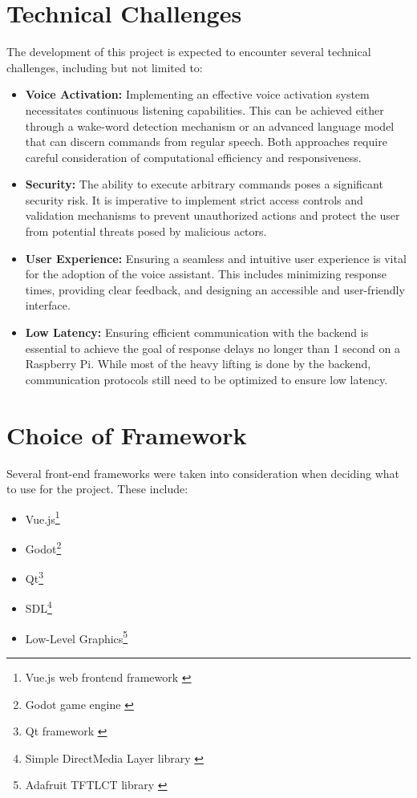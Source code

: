 \section{Technical Challenges}
The development of this project is expected to encounter several technical challenges, including but not limited to:
\begin{itemize}
    \item \textbf{Voice Activation:} Implementing an effective voice activation system necessitates continuous listening capabilities. This can be achieved either through a wake-word detection mechanism or an advanced language model that can discern commands from regular speech. Both approaches require careful consideration of computational efficiency and responsiveness.
    \item \textbf{Security:} The ability to execute arbitrary commands poses a significant security risk. It is imperative to implement strict access controls and validation mechanisms to prevent unauthorized actions and protect the user from potential threats posed by malicious actors.
    \item \textbf{User Experience:} Ensuring a seamless and intuitive user experience is vital for the adoption of the voice assistant. This includes minimizing response times, providing clear feedback, and designing an accessible and user-friendly interface.
    \item \textbf{Low Latency:} Ensuring efficient communication with the backend is essential to achieve the goal of response delays no longer than 1 second on a Raspberry Pi. While most of the heavy lifting is done by the backend, communication protocols still need to be optimized to ensure low latency.
\end{itemize}

\section{Choice of Framework}
Several front-end frameworks were taken into consideration when deciding what to use for the project. These include:
\begin{itemize}
\item Vue.js\footnote{Vue.js web frontend framework \cite{vuejs}}
\item Godot\footnote{Godot game engine \cite{godot}}
\item Qt\footnote{Qt framework \cite{qt}}
\item SDL\footnote{Simple DirectMedia Layer library \cite{sdl}}
\item Low-Level Graphics\footnote{Adafruit TFTLCT library \cite{adafruit-tftlcd}}
\end{itemize}

